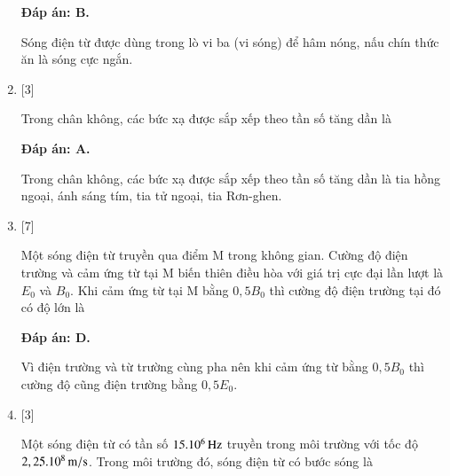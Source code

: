 \begin{enumerate}[label=\bfseries Câu \arabic*:]
	\hideall
	{		\textbf{Đáp án: B.}
		
Sóng điện từ được dùng trong lò vi ba (vi sóng) để hâm nóng, nấu chín thức ăn là sóng cực ngắn.
		
	}

	\item {} [3] %
	
	
	{Trong chân không, các bức xạ được sắp xếp theo tần số tăng dần là
	}
	
	\hideall
	{		\textbf{Đáp án: A.}
		
Trong chân không, các bức xạ được sắp xếp theo tần số tăng dần là tia hồng ngoại, ánh sáng tím, tia tử ngoại, tia Rơn-ghen.
		
	}

	\item {} [7] %
	
	
	{Một sóng điện từ truyền qua điểm M trong không gian. Cường độ điện trường và cảm ứng từ tại M biến thiên điều hòa với giá trị cực đại lần lượt là $E_0$ và $B_0$. Khi cảm ứng từ tại M bằng $ 0,5B_0$ thì cường độ điện trường tại đó có độ lớn là
	}
	
	\hideall
	{		\textbf{Đáp án: D.}
		
Vì điện trường và từ trường cùng pha nên khi cảm ứng từ bằng $0,5B_0$ thì cường độ cũng điện trường bằng $0,5E_0$.
		
	}


	\item {} [3]
	
	
	{Một sóng điện từ có tần  số $\xsi{15.10^{6}}{Hz}$ truyền trong môi trường với tốc độ $\xsi{2,25.10^{8}}{m/s}$. Trong môi trường đó, sóng điện từ có bước sóng là
	}
	

\end{enumerate}
